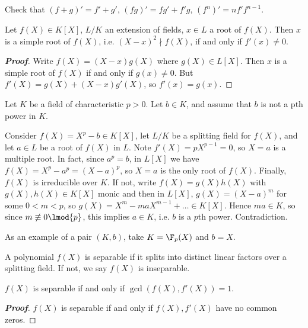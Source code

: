 \begin{problem}
Check that $(f + g)' = f' + g'$, $(fg)' = fg' + f'g$, $(f^n)' = nf'f^{n-1}$.
\end{problem}

\begin{proposition}
Let $f(X) \in K[X]$, $L/K$ an extension of fields, $x \in L$ a root of $f(X)$. Then $x$ is a simple root of $f(X)$, i.e. $(X - x)^2 \nmid f(X)$, if and only if $f'(x) \neq  0$.
\end{proposition}

\begin{proof}[\bf Proof]
Write $f(X) = (X-x)g(X)$ where $g(X) \in L[X]$. Then $x$ is a simple root of $f(X)$ if and only if $g(x) \neq 0$. But $f'(X) = g(X) + (X - x)g'(X)$, so $f'(x) = g(x)$.
\end{proof}

\begin{example}
Let $K$ be a field of characteristic $p > 0$. Let $b \in K$, and assume that $b$ is not a pth power in $K$.

Consider $f(X) = X^p - b \in K[X]$, let $L/K$ be a splitting field for $f(X)$, and let $a \in L$ be a root of $f(X)$ in $L$. Note $f'(X) = pX^{p-1} = 0$, so $X = a$ is a multiple root. In fact, since $a^p = b$, in $L[X]$ we have $f(X) = X^p - a^p = (X - a)^p$, so $X = a$ is the only root of $f(X)$. Finally, $f(X)$ is irreducible over $K$. If not, write $f(X) = g(X)h(X)$ with $g(X), h(X) \in K[X]$ monic and then in $L[X]$, $g(X) = (X - a)^m$ for some $0 < m < p$, so $g(X) = X^m - maX^{m-1} + \dots \in K[X]$. Hence $ma \in K$, so since $m \not\equiv 0 \lmod{p}$, this implies $a \in K$, i.e. $b$ is a $p$th power. Contradiction.
\end{example}

\begin{example}
As an example of a pair $(K, b)$, take $K = \F_p(X)$ and $b = X$.
\end{example}

\begin{definition}
A polynomial $f(X)$ is separable if it splits into distinct linear factors over a splitting field. If not, we say $f(X)$ is inseparable.
\end{definition}

\begin{corollary}
$f(X)$ is separable if and only if $\gcd(f(X), f'(X)) = 1$.
\end{corollary}

\begin{proof}[\bf Proof]
$f(X)$ is separable if and only if $f(X), f'(X)$ have no common zeros.
\end{proof}

